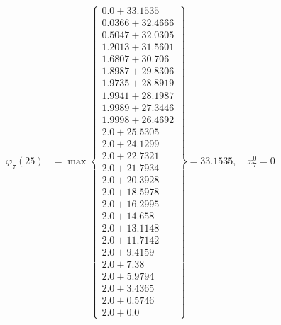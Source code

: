 \documentclass{article}
\begin{document}
\begin{align*}
\varphi_{7}(25) &= \max \left\{ \begin{array}{c}
0.0 + 33.1535 \\
 0.0366 + 32.4666 \\
 0.5047 + 32.0305 \\
 1.2013 + 31.5601 \\
 1.6807 + 30.706 \\
 1.8987 + 29.8306 \\
 1.9735 + 28.8919 \\
 1.9941 + 28.1987 \\
 1.9989 + 27.3446 \\
 1.9998 + 26.4692 \\
 2.0 + 25.5305 \\
 2.0 + 24.1299 \\
 2.0 + 22.7321 \\
 2.0 + 21.7934 \\
 2.0 + 20.3928 \\
 2.0 + 18.5978 \\
 2.0 + 16.2995 \\
 2.0 + 14.658 \\
 2.0 + 13.1148 \\
 2.0 + 11.7142 \\
 2.0 + 9.4159 \\
 2.0 + 7.38 \\
 2.0 + 5.9794 \\
 2.0 + 3.4365 \\
 2.0 + 0.5746 \\
 2.0 + 0.0
\end{array} \right\}=33.1535, \quad x_{7}^0=0\\
  

\end{align*}
\end{document}
